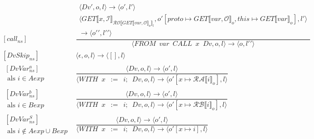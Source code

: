 \documentclass[12pt]{article}
\newcommand{\RA}{\mathcal{RA}}
\newcommand{\RB}{\mathcal{RB}}
\newcommand{\RO}{\mathcal{RO}}
\begin{document}
\[
\begin{matrix}
[call_{ns}] &
\dfrac
{
	\begin{matrix}
	\langle Dv', o, l \rangle \rightarrow \langle o\prime, l\prime \rangle\\
	\langle GET \llbracket x, \mathcal{I} \rrbracket_{\RO \llbracket GET\llbracket var, \mathcal{O} \rrbracket_o \rrbracket_l}, o\prime [proto \mapsto GET\llbracket var, \mathcal{O} \rrbracket_o, this \mapsto GET\llbracket var \rrbracket_o], l\prime \rangle\\
	\rightarrow
	\langle o\prime\prime, l\prime\prime \rangle
	\end{matrix}	
}
{
	\langle FROM \enspace var \enspace CALL \enspace x \enspace Dv,o,l \rangle
	\rightarrow
	\langle o, l\prime\prime \rangle
} \\[60pt]
[DvSkip_{ns}] &
\langle \epsilon ,o,l \rangle \rightarrow \langle [],l \rangle \\[60pt]
\begin{matrix}
[DvVar_{ns}^{a}]\\
\mbox{ als } i \in Aexp 
\end{matrix}
 &
\dfrac
{	\langle Dv,o,l \rangle \rightarrow \langle o\prime, l \rangle }
{
	\langle WITH \enspace x \enspace := \enspace i; \enspace Dv, o, l \rangle
	\rightarrow
	\langle o\prime[x \mapsto \RA \llbracket i \rrbracket_o], l \rangle
}\\[60pt]
\begin{matrix}
[DvVar_{ns}^{b}]\\
\mbox{ als } i \in Bexp
\end{matrix}
&
\dfrac
{	\langle Dv,o,l \rangle \rightarrow \langle o\prime, l \rangle }
{
	\langle WITH \enspace x \enspace := \enspace i; \enspace Dv, o, l \rangle
	\rightarrow
	\langle o\prime[x \mapsto \RB \llbracket i \rrbracket_o], l \rangle
}\\[60pt]
\begin{matrix}
[DvVar_{ns}^{S}]\\
\mbox{ als } i \notin Aexp \cup Bexp
\end{matrix}
&
\dfrac
{	\langle Dv,o,l \rangle \rightarrow \langle o\prime, l \rangle }
{
	\langle WITH \enspace x \enspace := \enspace i; \enspace Dv, o, l \rangle
	\rightarrow
	\langle o\prime[x \mapsto i ], l \rangle
}\\

\end{matrix}
\]

\end{document}
